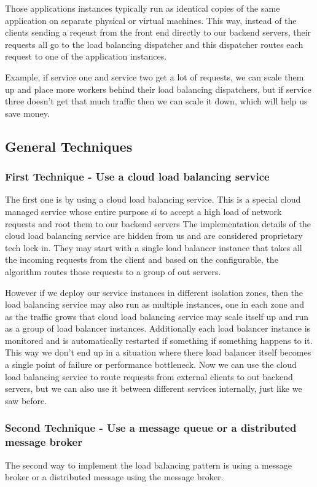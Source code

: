 Those applications instances typically run as identical copies of the same application on separate physical or virtual machines.
This way, instead of the clients sending a reqeust from the front end directly to our backend servers, their requests all go to the load balancing dispatcher and this dispatcher routes each request to one of the application instances.

Example, if service one and service two get a lot of requests, we can scale them up and place more workers behind their load balancing dispatchers, but if service three doesn't get that much traffic then we can scale it down, which will help us save money.

\subsection{General Techniques}

\subsubsection{First Technique - Use a cloud load balancing service}
The first one is by using a cloud load balancing service.
This is a special cloud managed service whose entire purpose si to accept a high load of network requests and root them to our backend servers
The implementation details of the cloud load balancing service are hidden from us and are considered proprietary tech lock in.
They may start with a single load balancer instance that takes all the incoming requests from the client and based on the configurable, the algorithm routes those requests to a group of out servers.

However if we deploy our service instances in different isolation zones, then the load balancing service may also run as multiple instances, one in each zone and as the traffic grows that cloud load balancing service may scale itself up and run as a group of load balancer instances.
Additionally each load balancer instance is monitored and is automatically restarted if something if something happens to it.
This way we don't end up in a situation where there load balancer itself becomes a single point of failure or performance bottleneck.
Now we can use the cloud load balancing service to route requests from external clients to out backend servers, but we can also use it between different services internally, just like we saw before.

\subsubsection{Second Technique - Use a message queue or a distributed message broker}
The second way to implement the load balancing pattern is using a message broker or a distributed message using the message broker.

